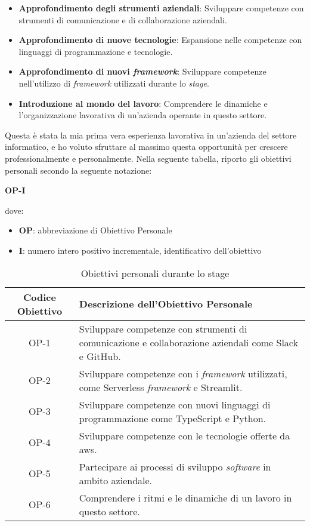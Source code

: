 \begin{itemize}
    \item \textbf{Approfondimento degli strumenti aziendali}: Sviluppare competenze con strumenti di comunicazione e di collaborazione aziendali.
    \item \textbf{Approfondimento di nuove tecnologie}: Espansione nelle competenze con linguaggi di programmazione e tecnologie.
    \item \textbf{Approfondimento di nuovi \textit{framework}}: Sviluppare competenze nell'utilizzo di \textit{framework} utilizzati durante lo \textit{stage}.
    \item \textbf{Introduzione al mondo del lavoro}: Comprendere le dinamiche e l'organizzazione lavorativa di un'azienda operante in questo settore.
\end{itemize}
Questa è stata la mia prima vera esperienza lavorativa in un'azienda del settore informatico, e ho voluto sfruttare al massimo questa opportunità per crescere professionalmente e personalmente.
Nella seguente tabella, riporto gli obiettivi personali secondo la seguente notazione:
\begin{center}
    \textbf{OP-I}
\end{center}
dove:
\begin{itemize}
    \item \textbf{OP}: abbreviazione di Obiettivo Personale
    \item \textbf{I}: numero intero positivo incrementale, identificativo dell'obiettivo
\end{itemize}
\begin{table}[H]
    \centering
    \begin{tabular}{|c|p{9cm}|}
        \hline
        \textbf{Codice Obiettivo} & \textbf{Descrizione dell'Obiettivo Personale} \\
        \hline
        OP-1 & Sviluppare competenze con strumenti di comunicazione e collaborazione aziendali come Slack e GitHub. \\
        \hline
        OP-2 & Sviluppare competenze con i \textit{framework} utilizzati, come Serverless \textit{framework} e Streamlit. \\
        \hline
        OP-3 & Sviluppare competenze con nuovi linguaggi di programmazione come TypeScript e Python. \\
        \hline
        OP-4 & Sviluppare competenze con le tecnologie offerte da \gls{aws}. \\
        \hline
        OP-5 & Partecipare ai processi di sviluppo \textit{software} in ambito aziendale. \\
        \hline
        OP-6 & Comprendere i ritmi e le dinamiche di un lavoro in questo settore. \\
        \hline
    \end{tabular}
    \caption{Obiettivi personali durante lo stage}
    \label{tab:obiettiviPersonali}
\end{table}